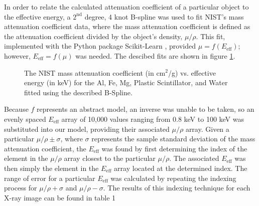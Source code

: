 In order to relate the calculated attenuation coefficient of a particular object to the effective energy, a $2^\text{nd}$ degree, 4 knot B-spline was used to fit NIST's mass attenuation coefficient data, where the mass attenuation coefficient is defined as the attenuation coefficient divided by the object's density, $\mu/\rho$. This fit, implemented with the Python package Scikit-Learn \cite{scikit-learn}, provided $\mu = f(E_{\text{eff}})$; however, $E_{\text{eff}} = f(\mu)$ was needed. The descibed fits are shown in figure \ref{figure:NISTSplineFit}.


\begin{figure}[htbp]
    \centering
\end{figure}

\begin{figure}[htbp]
    \addtocounter{subfigure}{2}
    \ContinuedFloat
    \addtocounter{figure}{1}
    \centering
    \caption{The NIST mass attenuation coefficient (in cm$^2$/g) vs. effective energy (in keV) for the Al, Fe, Mg, Plastic Scintillator, and Water fitted using the described B-Spline.}
    \label{figure:NISTSplineFit}
\end{figure}

\newpage
Because $f$ represents an abstract model, an inverse was unable to be taken, so an evenly spaced $E_{\text{eff}}$ array of 10,000 values ranging from 0.8 keV to 100 keV was substituted into our model, providing their associated $\mu/\rho$ array. Given a particular $\mu/\rho \pm \sigma$, where $\sigma$ represents the sample standard deviation of the mass attenuation coefficient, the $E_{\text{eff}}$ was found by first determining the index of the element in the $\mu/\rho$ array closest to the particular $\mu/\rho$. The associated $E_{\text{eff}}$ was then simply the element in the $E_{\text{eff}}$ array located at the determined index. The range of error for a particular $E_{\text{eff}}$ was calculated by repeating the indexing process for $\mu/\rho + \sigma$ and $\mu/\rho - \sigma$. The results of this indexing technique for each X-ray image can be found in table 1

